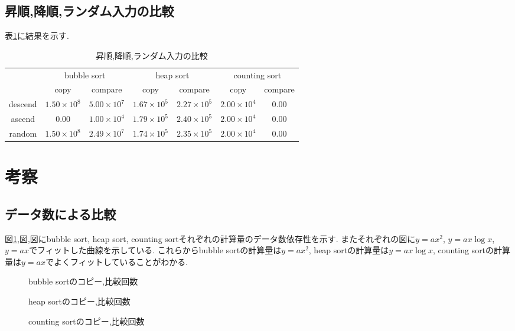 \documentclass[uplatex,a4j,11pt,dvipdfmx]{jsarticle}
\begin{document}
\subsection{昇順,降順,ランダム入力の比較}
表\ref{tab:1}に結果を示す.
\begin{table}[h]
\caption{昇順,降順,ランダム入力の比較}
\label{tab:1}
\centering
\begin{tabular}{c|cc|cc|cc}
\hline
&\multicolumn{2}{c|}{bubble sort}&\multicolumn{2}{c|}{heap sort}&\multicolumn{2}{c}{counting sort}\\
&copy&compare&copy&compare&copy&compare\\
\hline \hline
descend & $1.50\times10^{8}$ & $5.00\times10^{7}$ & $1.67\times10^{5}$ & $2.27\times10^{5}$ & $2.00\times10^{4}$ & $0.00$\\
ascend  & $0.00$             & $1.00\times10^{4}$ & $1.79\times10^{5}$ & $2.40\times10^{5}$ & $2.00\times10^{4}$ & $0.00$\\
random  & $1.50\times10^{8}$ & $2.49\times10^{7}$ & $1.74\times10^{5}$ & $2.35\times10^{5}$ & $2.00\times10^{4}$ & $0.00$\\
\hline
\end{tabular}
\end{table}
\clearpage
\section{考察}
\subsection{データ数による比較}
図\ref{fig:col_b},図,図にbubble sort, heap sort, counting sortそれぞれの計算量のデータ数依存性を示す.
またそれぞれの図に$y=ax^2$, $y=ax\log x$, $y=ax$でフィットした曲線を示している.
これらからbubble sortの計算量は$y=ax^2$, heap sortの計算量は$y=ax\log x$, counting sortの計算量は$y=ax$でよくフィットしていることがわかる.
\begin{figure}[hptb]
  \begin{center}
    
    \caption{bubble sortのコピー,比較回数}
    \label{fig:col_b}
  \end{center}
\end{figure}
\begin{figure}[hptb]
  \begin{center}
    
    \caption{heap sortのコピー,比較回数}
    \label{fig:col_h}
  \end{center}
\end{figure}
\begin{figure}[hptb]
  \begin{center}
    
    \caption{counting sortのコピー,比較回数}
    \label{fig:col_c}
  \end{center}
\end{figure}
\clearpage
\end{document}
